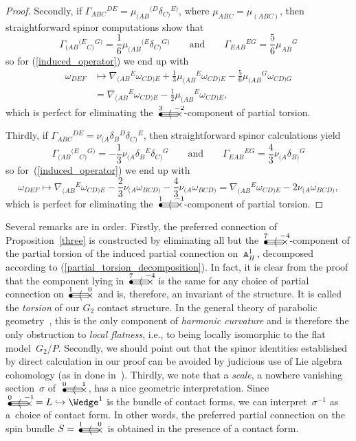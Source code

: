 \documentclass[10pt,a4paper]{amsart}
\numberwithin{equation}{section}
\newcommand{\gtwo}[2]{\begin{picture}(28,10)
\put(4,1.1){\makebox(0,0){$\bullet$}}
\put(24,1.5){\makebox(0,0){$\times$}}
\put(4,3.5){\line(1,0){18}}
\put(4,1.5){\line(1,0){20}}
\put(4,-.5){\line(1,0){18}}
\put(14,1.5){\makebox(0,0){$\langle$}}
\put(4,8){\makebox(0,0){$\scriptstyle #1$}}
\put(24,8){\makebox(0,0){$\scriptstyle #2$}}
\end{picture}}
\begin{document}
\begin{proof}
Secondly, if $\Gamma_{ABC}{}^{DE}=\mu_{(AB}{}^{(D}\delta_{C)}{}^{E)}$, where
$\mu_{ABC}=\mu_{(ABC)}$, then straightforward spinor computations show that
\[\textstyle\Gamma_{(AB}{}^{(E}{}_{C)}{}^{G)}
=\frac16\mu_{(AB}{}^{(E}\delta_{C)}{}^{G)}\qquad\mbox{and}\qquad
\Gamma_{EAB}{}^{EG}=\frac56\mu_{AB}{}^G\]
so for (\ref{induced_operator}) we end up with
\begin{align*} \omega_{DEF}& \mapsto
\nabla_{(AB}{}^E\omega_{CD)E}
+\tfrac13\mu_{(AB}{}^E\omega_{CD)E}
-\tfrac56\mu_{(AB}{}^G\omega_{CD)G}\\
& =\nabla_{(AB}{}^E\omega_{CD)E}
-\tfrac12\mu_{(AB}{}^E\omega_{CD)E},\end{align*}
which is perfect for eliminating the $\gtwo{3}{-2}$-component of partial
torsion.

Thirdly, if $\Gamma_{ABC}{}^{DE}=\nu_{(A}\delta_B{}^D\delta_{C)}{}^E$, then
straightforward spinor calculations yield
\[\textstyle\Gamma_{(AB}{}^{(E}{}_{C)}{}^{G)}
=-\frac13\nu_{(A}\delta_B{}^E\delta_{C)}{}^G\qquad\mbox{and}\qquad
\Gamma_{EAB}{}^{EG}=\frac43\nu_{(A}\delta_{B)}{}^G\]
so for~(\ref{induced_operator}) we end up with
\[\textstyle\omega_{DEF}\mapsto\nabla_{(AB}{}^E\omega_{CD)E}
-\frac23\nu_{(A}\omega_{BCD)}
-\frac43\nu_{(A}\omega_{BCD)}
=\nabla_{(AB}{}^E\omega_{CD)E}
-2\nu_{(A}\omega_{BCD)},\]
which is perfect for eliminating the $\gtwo{1}{-1}$-component of partial
torsion.
\end{proof}


Several remarks are in order. Firstly, the preferred connection of
Proposition~\ref{three} is constructed by eliminating all but the
$\gtwo{7}{-4}$-component of the partial torsion of the induced partial
connection on $\Wedge_H^1$, decomposed according to
(\ref{partial_torsion_decomposition}). In fact, it is clear from the proof that
the component lying in $\gtwo{7}{-4}$ is the same for any choice of partial
connection on $\gtwo{1}{0}$ and is, therefore, an invariant of the structure.
It is called the {\em torsion} of our $G_2$ contact structure. In the general
theory of parabolic geometry~\cite{CS}, this is the only component of
{\em harmonic curvature} and is therefore the only obstruction to
{\em local flatness}, i.e., to being locally isomorphic to the flat
model~$G_2/P$. Secondly, we should point out that the spinor identities
established by direct calculation in our proof can be avoided by judicious use
of Lie algebra cohomology (as in done in~\cite{CS}). Thirdly, we note that a
{\em scale}, a nowhere vanishing section~$\sigma$ of~$\gtwo{0}{1}$, has a
nice geometric interpretation. Since $\gtwo{0}{-1}=L\hookrightarrow\Wedge^1$
is the bundle of contact forms, we can interpret~$\sigma^{-1}$ as a~choice of
contact form. In other words, the preferred partial connection on the spin
bundle $S=\gtwo{1}{0}$ is obtained in the presence of a contact form.
\end{document}

